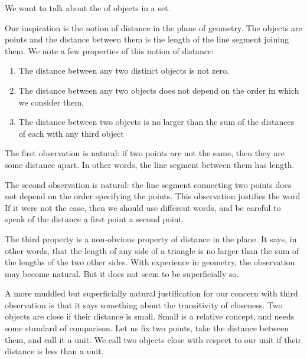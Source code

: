 
\sbasic



\sstart



We want to talk
about the 
of objects in a set.


Our inspiration is the notion
of distance in the plane
of geometry.
The objects
are points and the distance
between them is the length
of the line segment joining
them.
We note a few properties
of this notion of distance:

\begin{enumerate}
  \item
    The distance between any two
    distinct objects is not zero.

  \item
    The distance between any
    two objects does not depend
    on the order in which we
    consider them.

  \item
    The distance between
    two objects is no larger
    than the sum of the distances
    of each with any third object
\end{enumerate}

The first observation
is natural: if two points are not
the same, then they are some
distance apart.
In other words, the line
segment between
them has length.

The second observation is natural:
the line segment connecting
two points does not depend on the
order specifying the points.
This observation
justifies the word
If it were not the case,
then we should use different words,
and be careful to speak
of the distance  a
first point  a second
point.

The third property is
a non-obvious property of
distance in the plane.
It says, in other words,
that the length of any side
of a triangle is no larger than
the sum of the lengths of the
two other sides.
With experience in geometry,
the observation may become
natural. But it does
not seem to be superficially so.

A more muddled but superficially
natural justification for our
concern with third observation
is that it says something
about the transitivity of
closeness.
Two objects are close if
their distance is small.
Small is a relative concept,
and needs some standard of
comparison.
Let us fix two points, take
the distance between them,
and call it a unit.
We call two objects close
with respect to our unit
if their distance is less than a unit.

